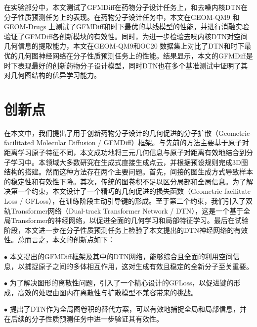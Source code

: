在实验部分中，本文测试了GFMDiff在药物分子设计任务上，和去噪内核DTN在分子性质预测任务上的表现。在药物分子设计任务中，本文在GEOM-QM9 \cite{qm9_ramakrishnan_14}和GEOM-Drugs \cite{drugs_axelrod_22}上测试了GFMDiff和时下最优的基线模型的性能，并进行消融实验验证了GFMDiff各创新模块的有效性。同时，为进一步检验去噪内核DTN对空间几何信息的提取能力，本文在GEOM-QM9和OC20 \cite{oc20_chanussot_21}数据集上对比了DTN和时下最优的几何图神经网络在分子性质预测任务上的性能。结果显示，本文的GFMDiff是时下表现最好的创新药物分子设计模型，同时DTN也在多个基准测试中证明了其对几何图结构的优异学习能力。

\section{创新点}
在本文中，我们提出了用于创新药物分子设计的几何促进的分子扩散（Geometric-facilitated Molecular Diffusion / GFMDiff）框架。与先前的方法主要基于原子对距离学习原子特征不同，本文成功地将三元几何信息与原子对距离有效地结合到分子学习中。本领域大多数研究在生成式直接生成点云，并根据预设规则完成3D图结构的搭建。然而这种方法存在两个主要问题。首先，间接的图生成方式导致样本的稳定性和有效性下降。其次，传统的图卷积不足以区分局部和全局信息。为了解决第一个约束，本文设计了一个精巧的几何促进的损失函数（Geometric-facilitate Loss / GFLoss），在训练阶段主动引导键的形成。至于第二个约束，我们引入了双轨Transformer网络（Dual-track Transformer Network / DTN），这是一个基于全局Transformer的神经网络，以促进全面的几何学习和局部特征学习。最后在试验阶段，本文进一步在分子性质预测任务上检验了本文提出的DTN神经网络的有效性。总而言之，本文的创新点如下：

$\bullet$ 本文提出的GFMDiff框架及其中的DTN网络，能够综合且全面的利用空间信息，以捕捉原子之间的多体相互作用，这对生成有效且稳定的全新分子至关重要。

$\bullet$ 为了解决图形的离散性问题，引入了一个精心设计的GFLoss，以促进键的形成，高效的处理由图内在离散性与扩散模型不兼容带来的挑战。

$\bullet$ 提出了DTN作为全局图卷积的替代方案，可以有效地捕捉全局和局部信息，并在后续的分子性质预测任务中进一步验证其有效性。

